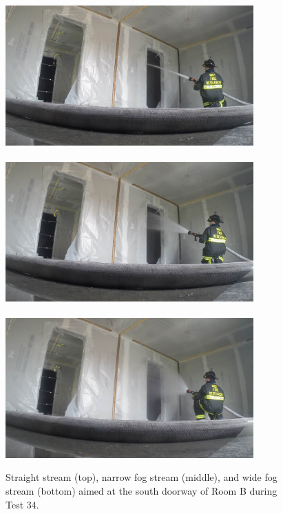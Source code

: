 \documentclass[12pt,oneside]{book}
\begin{document}
\begin{figure}[!ht]
	\includegraphics[trim=23cm 6.5cm 4cm 6cm, clip=true, width=3.75in]{../Figures/Pictures/SS_Room_B_Test_34}
	\\~\\
	\includegraphics[trim=23cm 6.5cm 4cm 6cm, clip=true, width=3.75in]{../Figures/Pictures/NF_Room_B_Test_34}
	\\~\\
	\includegraphics[trim=23cm 6.5cm 4cm 6cm, clip=true, width=3.75in]{../Figures/Pictures/WF_Room_B_Test_34}
	\caption[Straight stream, narrow fog stream, and wide fog stream during Test 34.]{Straight stream (top), narrow fog stream (middle), and wide fog stream (bottom) aimed at the south doorway of Room B during Test 34.}
	\label{fig:test_34_pic}
\end{figure}
\end{document}
